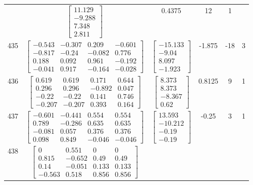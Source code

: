 \documentclass[a4paper,12pt]{article}
\begin{document}
\begin{tabular}{c c c c c c}
&
$\begin{bmatrix} 11.129 \\ -9.288 \\ 7.348 \\ 2.811 \end{bmatrix}$
&
0.4375
&
12
&
1
\\
435
&
$\begin{bmatrix} -0.543 & -0.307 & 0.209 & -0.601 \\ -0.817 & -0.24 & -0.082 & 0.776 \\ 0.188 & 0.092 & 0.961 & -0.192 \\ -0.041 & 0.917 & -0.164 & -0.028 \end{bmatrix}$
&
$\begin{bmatrix} -15.133 \\ -9.04 \\ 8.097 \\ -1.923 \end{bmatrix}$
&
-1.875
&
-18
&
3
\\
436
&
$\begin{bmatrix} 0.619 & 0.619 & 0.171 & 0.644 \\ 0.296 & 0.296 & -0.892 & 0.047 \\ -0.22 & -0.22 & 0.141 & 0.746 \\ -0.207 & -0.207 & 0.393 & 0.164 \end{bmatrix}$
&
$\begin{bmatrix} 8.373 \\ 8.373 \\ -8.367 \\ 0.62 \end{bmatrix}$
&
0.8125
&
9
&
1
\\
437
&
$\begin{bmatrix} -0.601 & -0.441 & 0.554 & 0.554 \\ 0.789 & -0.286 & 0.635 & 0.635 \\ -0.081 & 0.057 & 0.376 & 0.376 \\ 0.098 & 0.849 & -0.046 & -0.046 \end{bmatrix}$
&
$\begin{bmatrix} 13.593 \\ -10.212 \\ -0.19 \\ -0.19 \end{bmatrix}$
&
-0.25
&
3
&
1
\\
438
&
$\begin{bmatrix} 0 & 0.551 & 0 & 0 \\ 0.815 & -0.652 & 0.49 & 0.49 \\ 0.14 & -0.051 & 0.133 & 0.133 \\ -0.563 & 0.518 & 0.856 & 0.856 \end{bmatrix}$

\end{tabular}
\end{document}
